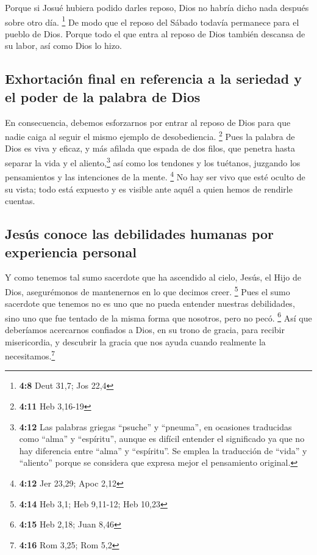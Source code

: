  Porque si Josué hubiera podido darles reposo, Dios no
habría dicho nada después sobre otro día. \footnote{\textbf{4:8} Deut
  31,7; Jos 22,4}  De modo que el reposo del Sábado
todavía permanece para el pueblo de Dios.  Porque todo el
que entra al reposo de Dios también descansa de su labor, así como Dios
lo hizo.

\hypertarget{exhortaciuxf3n-final-en-referencia-a-la-seriedad-y-el-poder-de-la-palabra-de-dios}{%
\subsection{Exhortación final en referencia a la seriedad y el poder de
la palabra de
Dios}\label{exhortaciuxf3n-final-en-referencia-a-la-seriedad-y-el-poder-de-la-palabra-de-dios}}

 En consecuencia, debemos esforzarnos por entrar al
reposo de Dios para que nadie caiga al seguir el mismo ejemplo de
desobediencia. \footnote{\textbf{4:11} Heb 3,16-19}  Pues
la palabra de Dios es viva y eficaz, y más afilada que espada de dos
filos, que penetra hasta separar la vida y el aliento,\footnote{\textbf{4:12}
  Las palabras griegas ``psuche'' y ``pneuma'', en ocasiones traducidas
  como ``alma'' y ``espíritu'', aunque es difícil entender el
  significado ya que no hay diferencia entre ``alma'' y ``espíritu''. Se
  emplea la traducción de ``vida'' y ``aliento'' porque se considera que
  expresa mejor el pensamiento original.} así como los tendones y los
tuétanos, juzgando los pensamientos y las intenciones de la mente.
\footnote{\textbf{4:12} Jer 23,29; Apoc 2,12}  No hay ser
vivo que esté oculto de su vista; todo está expuesto y es visible ante
aquél a quien hemos de rendirle cuentas.

\hypertarget{jesuxfas-conoce-las-debilidades-humanas-por-experiencia-personal}{%
\subsection{Jesús conoce las debilidades humanas por experiencia
personal}\label{jesuxfas-conoce-las-debilidades-humanas-por-experiencia-personal}}

 Y como tenemos tal sumo sacerdote que ha ascendido al
cielo, Jesús, el Hijo de Dios, asegurémonos de mantenernos en lo que
decimos creer. \footnote{\textbf{4:14} Heb 3,1; Heb 9,11-12; Heb 10,23}
 Pues el sumo sacerdote que tenemos no es uno que no
pueda entender nuestras debilidades, sino uno que fue tentado de la
misma forma que nosotros, pero no pecó. \footnote{\textbf{4:15} Heb
  2,18; Juan 8,46}  Así que deberíamos acercarnos
confiados a Dios, en su trono de gracia, para recibir misericordia, y
descubrir la gracia que nos ayuda cuando realmente la
necesitamos.\footnote{\textbf{4:16} Rom 3,25; Rom 5,2}

